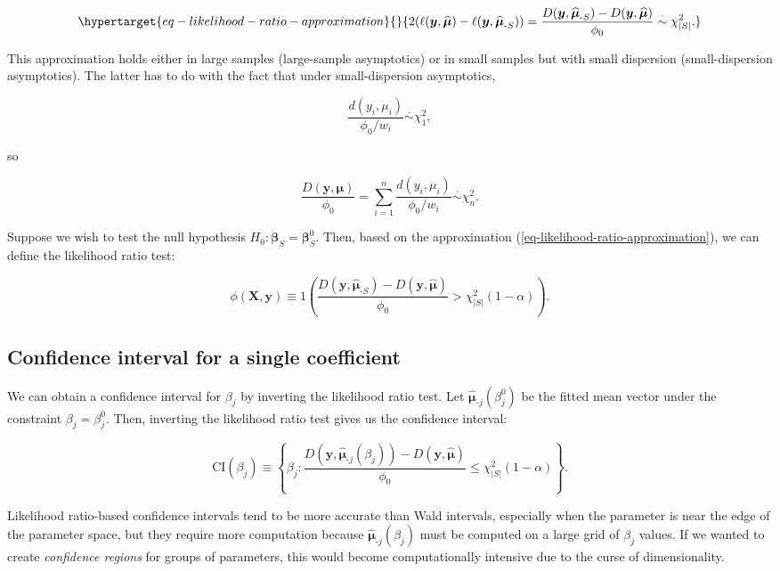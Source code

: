 \documentclass[
  11pt,
  letterpaper,
  oneside]{book}
\theoremstyle{plain}
\theoremstyle{plain}
\theoremstyle{definition}
\theoremstyle{definition}
\theoremstyle{plain}
\theoremstyle{remark}
\begin{document}
\begin{equation}\protect\hypertarget{eq-likelihood-ratio-approximation}{}{
2(\ell(\boldsymbol{y}, \boldsymbol{\widehat{\mu}}) - \ell(\boldsymbol{y}, \boldsymbol{\widehat{\mu}}_{\text{-}S})) = \frac{D(\boldsymbol{y}, \boldsymbol{\widehat{\mu}}_{\text{-}S}) - D(\boldsymbol{y}, \boldsymbol{\widehat{\mu}})}{\phi_0} \overset{\cdot}{\sim} \chi^2_{|S|}.
}\label{eq-likelihood-ratio-approximation}\end{equation}

This approximation holds either in large samples (large-sample
asymptotics) or in small samples but with small dispersion
(small-dispersion asymptotics). The latter has to do with the fact that
under small-dispersion asymptotics,

\[
\frac{d(y_i, \mu_i)}{\phi_0/w_i} \overset{\cdot}{\sim} \chi^2_1,
\]

so

\[
\frac{D(\boldsymbol{y}, \boldsymbol{\mu})}{\phi_0} = \sum_{i = 1}^n \frac{d(y_i, \mu_i)}{\phi_0/w_i} \overset{\cdot}{\sim} \chi^2_n.
\]

Suppose we wish to test the null hypothesis
\(H_0: \boldsymbol{\beta}_S = \boldsymbol{\beta}_S^0\). Then, based on
the approximation (\ref{eq-likelihood-ratio-approximation}), we can
define the likelihood ratio test:

\[
\phi(\boldsymbol{X}, \boldsymbol{y}) \equiv 1\left(\frac{D(\boldsymbol{y}, \boldsymbol{\widehat{\mu}}_{\text{-}S}) - D(\boldsymbol{y}, \boldsymbol{\widehat{\mu}})}{\phi_0} > \chi^2_{|S|}(1-\alpha)\right).
\]

\hypertarget{sec-likelihood-ratio-ci-single-coeff}{%
\subsection{Confidence interval for a single
coefficient}\label{sec-likelihood-ratio-ci-single-coeff}}

We can obtain a confidence interval for \(\beta_j\) by inverting the
likelihood ratio test. Let
\(\boldsymbol{\widehat{\mu}}_{\text{-}j}(\beta_j^0)\) be the fitted mean
vector under the constraint \(\beta_j = \beta_j^0\). Then, inverting the
likelihood ratio test gives us the confidence interval:

\[
\text{CI}(\beta_j) \equiv \left\{\beta_j: \frac{D(\boldsymbol{y}, \boldsymbol{\widehat{\mu}}_{\text{-}j}(\beta_j)) - D(\boldsymbol{y}, \boldsymbol{\widehat{\mu}})}{\phi_0} \leq \chi^2_{|S|}(1-\alpha)\right\}.
\]

Likelihood ratio-based confidence intervals tend to be more accurate
than Wald intervals, especially when the parameter is near the edge of
the parameter space, but they require more computation because
\(\boldsymbol{\widehat{\mu}}_{\text{-}j}(\beta_j)\) must be computed on
a large grid of \(\beta_j\) values. If we wanted to create
\emph{confidence regions} for groups of parameters, this would become
computationally intensive due to the curse of dimensionality.
\end{document}
